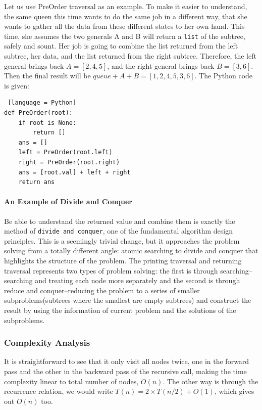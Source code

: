 \documentclass[../main.tex]{subfiles}
\begin{document}
Let us use PreOrder traversal as an example. To make it easier to understand, the same queen this time wants to do the same job in a different way, that she wants to gather all the data from these different states to her own hand. This time, she assumes the two generals A and B will return a \texttt{list} of the subtree, safely and sount. Her job is going to combine the list returned from the left subtree, her data, and the list returned from the right subtree. Therefore, the left general brings back $A=[2,4,5]$, and the right general brings back $B=[3, 6]$. Then the final result will be $queue + A + B = [1,2,4,5,3, 6]$. The Python code is given:
\begin{lstlisting} [language = Python]
def PreOrder(root):
    if root is None:
        return []
    ans = []
    left = PreOrder(root.left)
    right = PreOrder(root.right)
    ans = [root.val] + left + right
    return ans
\end{lstlisting}
\paragraph{An Example of Divide and Conquer} Be able to understand the returned value and combine them is exactly the method of \texttt{divide and conquer}, one of the fundamental algorithm design principles. This is a seemingly trivial change, but it approaches the problem solving from a totally different angle: atomic searching to divide and conquer that highlights the structure of the problem. The printing traversal and returning traversal represents two types of problem solving: the first is through searching--searching and treating each node more separately and the second is through reduce and conquer--reducing the problem to a series of smaller subproblems(subtrees where the smallest are empty subtrees) and construct the result by using the information of current problem and the solutions of the subproblems. 

\subsubsection{Complexity Analysis}
It is straightforward to see that it only visit all nodes twice, one in the forward pass and the other in the backward pass of the recursive call, making the time complexity linear to total number of nodes, $O(n)$. The other way is through the recurrence relation, we would write $T(n)=2\times T(n/2)+O(1)$, which gives out $O(n)$ too. 
    
\end{document}
